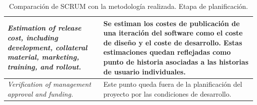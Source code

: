 \begin{table}[]
\begin{tabular}{p{5cm} p{6cm}}
        \textit{Estimation of release cost, including development, collateral material, marketing, training, and rollout.} & Se estiman los costes de publicación de una iteración del software como el coste de diseño y el coste de desarrollo. Estas estimaciones quedan reflejadas como punto de historia asociadas a las historias de usuario individuales. \\ \hline
        
        \textit{Verification of management approval and funding.} & Este punto queda fuera de la planificación del proyecto por las condiciones de desarrollo. \\ 
    \end{tabular}   
    \caption{Comparación de SCRUM con la metodología realizada. Etapa de planificación.}
    \label{tab:met_planificacion}
\end{table}

